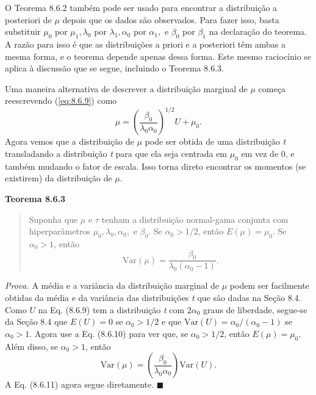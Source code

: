 \vspace{1em}
O Teorema 8.6.2 também pode ser usado para encontrar a distribuição a posteriori de $\mu$ depois que os dados são observados. Para fazer isso, basta substituir $\mu_0$ por $\mu_1, \lambda_0$ por $\lambda_1, \alpha_0$ por $\alpha_1,$ e $\beta_0$ por $\beta_1$ na declaração do teorema. A razão para isso é que as distribuições a priori e a posteriori têm ambas a mesma forma, e o teorema depende apenas dessa forma. Este mesmo raciocínio se aplica à discussão que se segue, incluindo o Teorema 8.6.3.

Uma maneira alternativa de descrever a distribuição marginal de $\mu$ começa reescrevendo (\ref{eq:8.6.9}) como
\begin{equation} \label{eq:8.6.10}
    \mu = \left(\frac{\beta_0}{\lambda_0\alpha_0}\right)^{1/2} U + \mu_0.
\end{equation}
Agora vemos que a distribuição de $\mu$ pode ser obtida de uma distribuição \textit{t} transladando a distribuição \textit{t} para que ela seja centrada em $\mu_0$ em vez de 0, e também mudando o fator de escala. Isso torna direto encontrar os momentos (se existirem) da distribuição de $\mu$.

\vspace{1em}
\noindent\textbf{Teorema 8.6.3}
\begin{quote}
    Suponha que $\mu$ e $\tau$ tenham a distribuição normal-gama conjunta com hiperparâmetros $\mu_0, \lambda_0, \alpha_0,$ e $\beta_0$. Se $\alpha_0 > 1/2$, então $E(\mu) = \mu_0$. Se $\alpha_0 > 1$, então
    \begin{equation} \label{eq:8.6.11}
        \text{Var}(\mu) = \frac{\beta_0}{\lambda_0(\alpha_0 - 1)}.
    \end{equation}
\end{quote}
\vspace{1em}

\noindent\textit{Prova.} A média e a variância da distribuição marginal de $\mu$ podem ser facilmente obtidas da média e da variância das distribuições \textit{t} que são dadas na Seção 8.4. Como $U$ na Eq. (8.6.9) tem a distribuição \textit{t} com $2\alpha_0$ graus de liberdade, segue-se da Seção 8.4 que $E(U) = 0$ se $\alpha_0 > 1/2$ e que $\text{Var}(U) = \alpha_0/(\alpha_0 - 1)$ se $\alpha_0 > 1$. Agora use a Eq. (8.6.10) para ver que, se $\alpha_0 > 1/2$, então $E(\mu) = \mu_0$. Além disso, se $\alpha_0 > 1$, então
$$
\text{Var}(\mu) = \left(\frac{\beta_0}{\lambda_0\alpha_0}\right) \text{Var}(U).
$$
A Eq. (8.6.11) agora segue diretamente. \hfill $\blacksquare$

